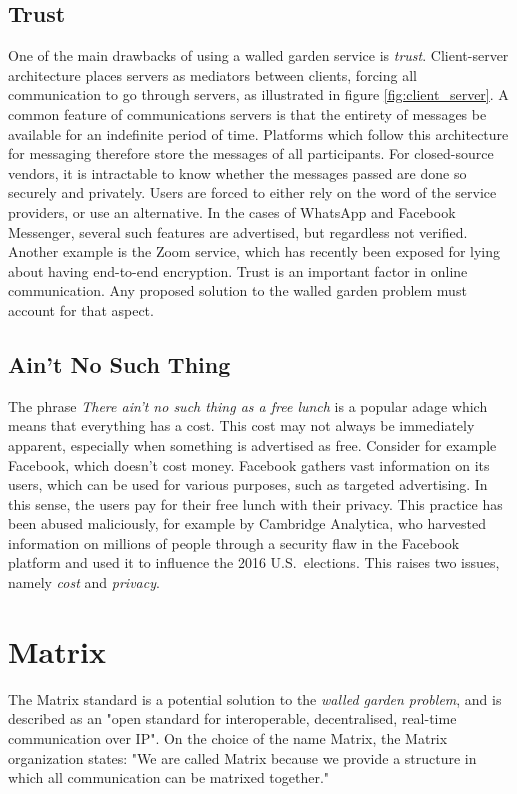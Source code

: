 \subsection{Trust}\label{sec:Trust}
One of the main drawbacks of using a walled garden service is \textit{trust}.
Client-server architecture places servers as mediators between clients, forcing all communication to go through servers, as illustrated in figure \ref{fig:client_server}.
A common feature of communications servers is that the entirety of messages be available for an indefinite period of time.
Platforms which follow this architecture for messaging therefore store the messages of all participants.
For closed-source vendors, it is intractable to know whether the messages passed are done so securely and privately.
Users are forced to either rely on the word of the service providers, or use an alternative.
In the cases of WhatsApp and Facebook Messenger, several such features are advertised, but regardless not verified\cite{twitter_comms_protocol_comparison}.
Another example is the Zoom service, which has recently been exposed for lying about having end-to-end encryption\cite{zoom_e2ee_or_not}.
Trust is an important factor in online communication.
Any proposed solution to the walled garden problem must account for that aspect.

\subsection{Ain't No Such Thing}
The phrase \textit{There ain't no such thing as a free lunch} is a popular adage which means that everything has a cost.
This cost may not always be immediately apparent, especially when something is advertised as free.
Consider for example Facebook, which doesn't cost money.
Facebook gathers vast information on its users, which can be used for various purposes, such as targeted advertising.
In this sense, the users pay for their free lunch with their privacy.
This practice has been abused maliciously, for example by Cambridge Analytica,
who harvested information on millions of people through a security flaw in the Facebook platform and used it to influence the 2016 U.S.~elections\cite{cadwalladr2018revealed, cadwalladr2018cambridge, isaak2018user, berghel2018malice}.
This raises two issues, namely \textit{cost} and \textit{privacy}.

\section{Matrix}
The Matrix standard is a potential solution to the \textit{walled garden problem}, and is described as an "open standard for interoperable, decentralised, real-time communication over IP"\cite{matrix_org}.
On the choice of the name Matrix, the Matrix organization states: "We are called Matrix because we provide a structure in which all communication can be matrixed together."\cite{matrix_org_faq}

